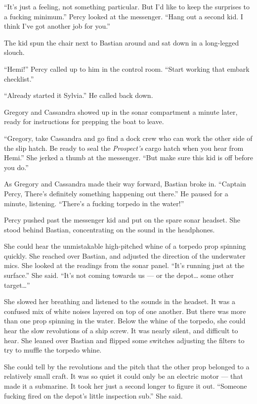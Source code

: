 \documentclass[]{scrbook}
\begin{document}
``It's just a feeling, not something particular. But I'd like to keep
the surprises to a fucking minimum.'' Percy looked at the messenger.
``Hang out a second kid. I think I've got another job for you.''

The kid spun the chair next to Bastian around and sat down in a
long-legged slouch.

``Hemi!'' Percy called up to him in the control room. ``Start working
that embark checklist.''

``Already started it Sylvia.'' He called back down.

Gregory and Cassandra showed up in the sonar compartment a minute later,
ready for instructions for prepping the boat to leave.

``Gregory, take Cassandra and go find a dock crew who can work the other
side of the slip hatch. Be ready to seal the \emph{Prospect's} cargo
hatch when you hear from Hemi.'' She jerked a thumb at the messenger.
``But make sure this kid is off before you do.''

As Gregory and Cassandra made their way forward, Bastian broke in.
``Captain Percy, There's definitely something happening out there.'' He
paused for a minute, listening. ``There's a fucking torpedo in the
water!''

Percy pushed past the messenger kid and put on the spare sonar headset.
She stood behind Bastian, concentrating on the sound in the headphones.

She could hear the unmistakable high-pitched whine of a torpedo prop
spinning quickly. She reached over Bastian, and adjusted the direction
of the underwater mics. She looked at the readings from the sonar panel.
``It's running just at the surface.'' She said. ``It's not coming
towards us --- or the depot\ldots{} some other target\ldots{}''

She slowed her breathing and listened to the sounds in the headset. It
was a confused mix of white noises layered on top of one another. But
there was more than one prop spinning in the water. Below the whine of
the torpedo, she could hear the slow revolutions of a ship screw. It was
nearly silent, and difficult to hear. She leaned over Bastian and
flipped some switches adjusting the filters to try to muffle the torpedo
whine.

She could tell by the revolutions and the pitch that the other prop
belonged to a relatively small craft. It was so quiet it could only be
an electric motor --- that made it a submarine. It took her just a
second longer to figure it out. ``Someone fucking fired on the depot's
little inspection sub.'' She said.
\end{document}
